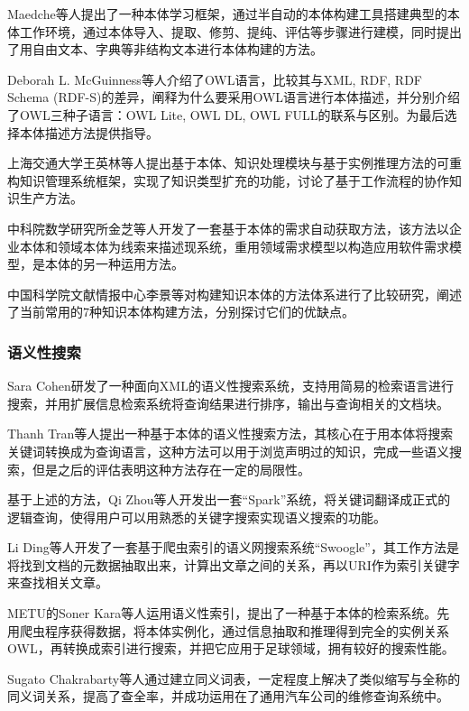 \documentclass[12pt,a4paper]{article}
\begin{document}
	{\Times Maedche}等人提出了一种本体学习框架，通过半自动的本体构建工具搭建典型的本体工作环境，通过本体导入、提取、修剪、提纯、评估等步骤进行建模，同时提出了用自由文本、字典等非结构文本进行本体构建的方法\cite{7}。
	
	{\Times Deborah L. McGuinness}等人介绍了{\Times OWL}语言，比较其与{\Times XML, RDF, RDF Schema (RDF-S)}的差异，阐释为什么要采用{\Times OWL}语言进行本体描述，并分别介绍了{\Times OWL}三种子语言：{\Times OWL Lite, OWL DL, OWL FULL}的联系与区别\cite{8}。为最后选择本体描述方法提供指导。
	
	上海交通大学王英林等人提出基于本体、知识处理模块与基于实例推理方法的可重构知识管理系统框架，实现了知识类型扩充的功能，讨论了基于工作流程的协作知识生产方法\cite{9}。
	
	中科院数学研究所金芝等人开发了一套基于本体的需求自动获取方法，该方法以企业本体和领域本体为线索来描述现系统，重用领域需求模型以构造应用软件需求模型\cite{10}，是本体的另一种运用方法。
	
	中国科学院文献情报中心李景等对构建知识本体的方法体系进行了比较研究，阐述了当前常用的7种知识本体构建方法，分别探讨它们的优缺点\cite{11}。
	
		\subsubsection*{语义性搜索}
	{\Times Sara Cohen}研发了一种面向XML的语义性搜索系统，支持用简易的检索语言进行搜索，并用扩展信息检索系统将查询结果进行排序，输出与查询相关的文档块\cite{12}。

	{\Times Thanh Tran}等人提出一种基于本体的语义性搜索方法，其核心在于用本体将搜索关键词转换成为查询语言，这种方法可以用于浏览声明过的知识，完成一些语义搜索\cite{13}，但是之后的评估表明这种方法存在一定的局限性。

	基于上述的方法，{\Times Qi Zhou}等人开发出一套“{\Times Spark}”系统，将关键词翻译成正式的逻辑查询，使得用户可以用熟悉的关键字搜索实现语义搜索的功能\cite{14}。

	{\Times Li Ding}等人开发了一套基于爬虫索引的语义网搜索系统“{\Times Swoogle}”，其工作方法是将找到文档的元数据抽取出来，计算出文章之间的关系，再以{\Times URI}作为索引关键字来查找相关文章\cite{15}。

	{\Times METU}的{\Times Soner Kara}等人运用语义性索引，提出了一种基于本体的检索系统。先用爬虫程序获得数据，将本体实例化，通过信息抽取和推理得到完全的实例关系{\Times OWL}，再转换成索引进行搜索，并把它应用于足球领域\cite{16}，拥有较好的搜索性能。

	{\Times Sugato Chakrabarty}等人通过建立同义词表，一定程度上解决了类似缩写与全称的同义词关系，提高了查全率，并成功运用在了通用汽车公司的维修查询系统中\cite{17}。
\end{document}
